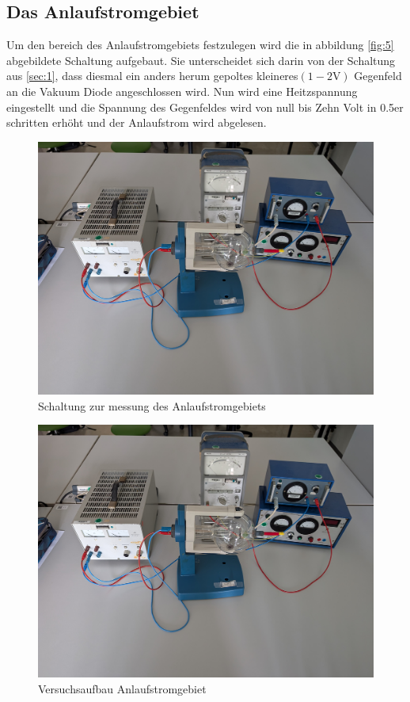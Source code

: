 \subsection{Das Anlaufstromgebiet}
Um den bereich des Anlaufstromgebiets festzulegen wird die in abbildung \autoref{fig:5} abgebildete Schaltung aufgebaut. Sie unterscheidet sich 
darin von der Schaltung aus \autoref{sec:1}, dass diesmal ein anders herum gepoltes kleineres$\left(1 - 2\unit{\volt}\right)$ Gegenfeld an die Vakuum Diode angeschlossen wird.
Nun wird eine Heitzspannung eingestellt und die Spannung des Gegenfeldes wird von null bis Zehn Volt in 0.5er schritten erhöht und der Anlaufstrom wird abgelesen.
\begin{figure}[H]
    \centering
        \centering
        \includegraphics[width=\textwidth]{Bilder/1.jpg}
        \caption{Schaltung zur messung des Anlaufstromgebiets}
    \hfill
    \label{fig:5}
\end{figure}
\begin{figure}[H]
    \centering
        \centering
        \includegraphics[width=\textwidth]{Bilder/1.jpg}
        \caption{Versuchsaufbau Anlaufstromgebiet}
    \hfill
    \label{fig:6}
\end{figure}
